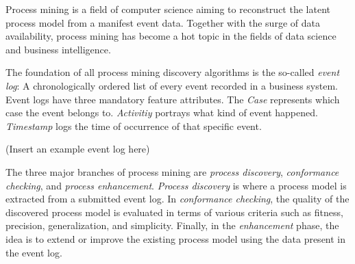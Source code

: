 \begin{comment}
	This
	\item Position the caption of a Figure below the figure.
	\item Position the caption of a Table above the table.
	\item Write Section Headings and Titles Like This\\
	Good: Approximation Bias in Unstable Systems\\
	Bad: Approximation bias in unstable systems\\
	\item Be consistent in your references.
	\begin{itemize}
		\item Make sure that the name of the same author is always the same (using DBLP helps for this)
		\item Titles should be consistent. Either use the style previously described, i.e., Approximation Bias in Unstable Systems or Approximation bias in unstable systems (this is allowed in the references, opposed to your own section headings and titles, however, \emph{BE CONSISTENT}).
	\end{itemize}
\end{enumerate}
\item Next steps: Develop a library to play-out translucent logs from a process model (petri net).
\end{comment}

Process mining is a field of computer science aiming to reconstruct the latent process model from a manifest event data. Together with the surge of data availability, process mining has become a hot topic in the fields of data science and business intelligence. 

The foundation of all process mining discovery algorithms is the so-called \emph{event log}: A chronologically ordered list of every event recorded in a business system. Event logs have three mandatory feature attributes. The \emph{Case} represents which case the event belongs to. \emph{Activitiy} portrays what kind of event happened. \emph{Timestamp} logs the time of occurrence of that specific event. 

(Insert an example event log here)

The three major branches of process mining are \emph{process discovery}, \emph{conformance checking}, and \emph{process enhancement}. \emph{Process discovery} is where a process model is extracted from a submitted event log. In \emph{conformance checking}, the quality of the discovered process model is evaluated in terms of various criteria such as fitness, precision, generalization, and simplicity. Finally, in the \emph{enhancement} phase, the idea is to extend or improve the existing process model using the data present in the event log.











